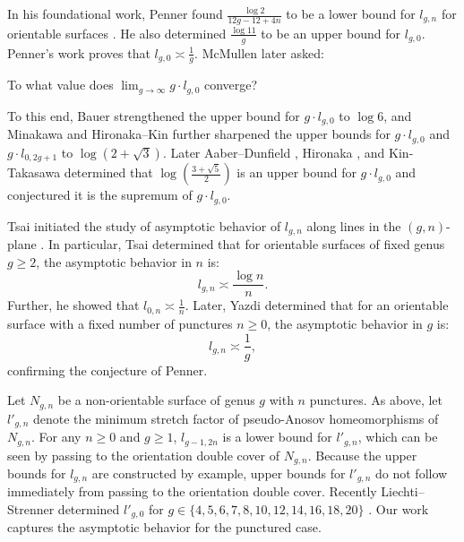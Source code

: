  In his foundational work, Penner found $\frac{\log 2}{12g-12+4n}$ to be a lower bound for $l_{g,n}$ for orientable surfaces \cite{penner1991bounds}.  He also determined $\frac{\log 11}{g}$ to be an upper bound for $l_{g,0}$.  Penner's work proves that $l_{g,0}\asymp \frac{1}{g}$.  McMullen  \cite{mcmullen2000polynomial} later asked:
\begin{question}[McMullen]
To what value does $\displaystyle\lim_{g\rightarrow\infty}g\cdot l_{g,0}$ converge?
\end{question}
To this end, Bauer \cite{bauer} strengthened the upper bound for $g\cdot l_{g,0}$ to $\log 6$, and Minakawa \cite{minakawa} and Hironaka--Kin \cite{HK} further sharpened the upper bounds for $g\cdot l_{g,0}$ and $g\cdot l_{0,2g+1}$ to $\log(2+\sqrt{3})$.  Later Aaber--Dunfield \cite{AD}, Hironaka \cite{hironaka}, and Kin-Takasawa \cite{KTbounds} determined that $\log\left(\frac{3+\sqrt{5}}{2}\right)$ is an upper bound for $g\cdot l_{g,0}$ and conjectured it is the supremum of $g\cdot l_{g,0}$.

Tsai initiated the study of asymptotic behavior of $l_{g,n}$ along lines in the $(g,n)$-plane \cite{tsai2009asymptotic}.  In particular, Tsai determined that for orientable surfaces of fixed genus $g\geq 2$, the asymptotic behavior in $n$ is:
$$l_{g,n}\asymp \frac{\log n}{n}.$$
Further, he showed that $l_{0,n}\asymp \frac{1}{n}.$
Later, Yazdi \cite{yazdi2018pseudo} determined that for an orientable surface with a fixed number of punctures $n\geq 0$, the asymptotic behavior in $g$ is:
$$l_{g,n}\asymp \frac{1}{g},$$
confirming the conjecture of Penner.

Let $N_{g,n}$ be a non-orientable surface of genus $g$ with $n$ punctures.  As above, let $l'_{g,n}$ denote the minimum stretch factor of pseudo-Anosov homeomorphisms of $N_{g,n}$.  For any $n\geq 0$ and $g\geq 1$, $l_{g-1,2n}$ is a lower bound for $l'_{g,n}$, which can be seen by passing to the orientation double cover of $N_{g,n}$.  Because the upper bounds for $l_{g,n}$ are constructed by example, upper bounds for $l'_{g,n}$ do not follow immediately from passing to the orientation double cover.  Recently Liechti--Strenner determined $l'_{g,0}$ for $g\in\{4,5,6,7,8,10,12,14,16,18,20\}$ \cite{LS}.  Our work captures the asymptotic behavior for the punctured case.



